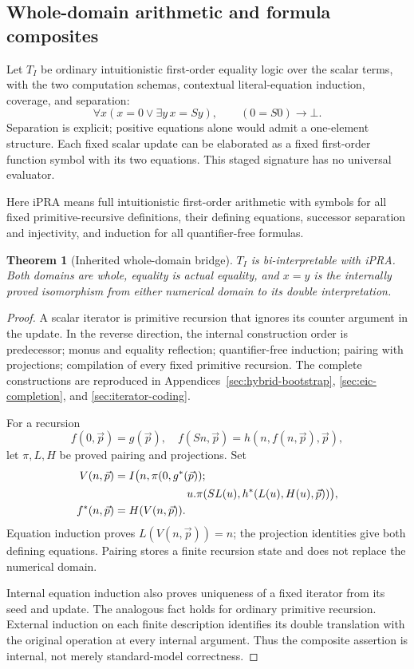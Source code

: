 \documentclass[11pt]{article}
\newtheorem{theorem}{Theorem}[section]
\theoremstyle{definition}\newtheorem{definition}[theorem]{Definition}
\theoremstyle{remark}\newtheorem{remark}[theorem]{Remark}
\begin{document}
\subsection{Whole-domain arithmetic and formula composites}

Let $T_I$ be ordinary intuitionistic first-order equality logic over
the scalar terms, with the two computation schemas, contextual
literal-equation induction, coverage, and separation:
\[
 \forall x(x=0\vee\exists y\,x=Sy),\qquad (0=S0)\to\bot.
\]
Separation is explicit; positive equations alone would admit a
one-element structure. Each fixed scalar update can be elaborated as
a fixed first-order function symbol with its two equations. This
staged signature has no universal evaluator.

Here iPRA means full intuitionistic first-order arithmetic with
symbols for all fixed primitive-recursive definitions, their
defining equations, successor separation and injectivity, and
induction for all quantifier-free formulas.

\begin{theorem}[Inherited whole-domain bridge]
$T_I$ is bi-interpretable with iPRA. Both domains are whole, equality
is actual equality, and $x=y$ is the internally proved isomorphism
from either numerical domain to its double interpretation.
\end{theorem}
\begin{proof}
A scalar iterator is primitive recursion that ignores its counter
argument in the update. In the reverse direction, the internal
construction order is predecessor; monus and equality reflection;
quantifier-free induction; pairing with projections; compilation of
every fixed primitive recursion. The complete constructions are
reproduced in Appendices~\ref{sec:hybrid-bootstrap},
\ref{sec:eic-completion}, and \ref{sec:iterator-coding}.

For a recursion
\[
f(0,\vec p)=g(\vec p),\quad
f(Sn,\vec p)=h(n,f(n,\vec p),\vec p),
\]
let $\pi,L,H$ be proved pairing and projections. Set
\[
\begin{split}
V(n,\vec p)&=I\bigl(n,\pi(0,g^*(\vec p));\\
 &\hspace{23mm}u.\pi(SL(u),h^*(L(u),H(u),\vec p))\bigr),\\
f^*(n,\vec p)&=H(V(n,\vec p)).
\end{split}
\]
Equation induction proves $L(V(n,\vec p))=n$; the projection
identities give both defining equations. Pairing stores a finite
recursion state and does not replace the numerical domain.

Internal equation induction also proves uniqueness of a fixed
iterator from its seed and update. The analogous fact holds for
ordinary primitive recursion. External induction on each finite
description identifies its double translation with the original
operation at every internal argument. Thus the composite assertion
is internal, not merely standard-model correctness.
\end{proof}
\end{document}

